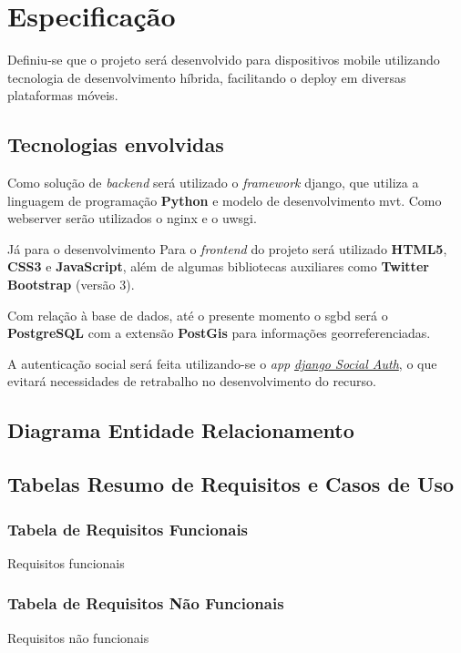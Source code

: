 \chapter{Especificação}\label{chp: Especificação}
Definiu-se que o projeto será desenvolvido para dispositivos mobile utilizando tecnologia de desenvolvimento híbrida, facilitando o deploy em diversas plataformas móveis.

\section{Tecnologias envolvidas}\label{sec: TecEnvolv}
Como solução de \textit{backend} será utilizado o \textit{framework} \gls{django}, que utiliza a linguagem de programação \textbf{Python} e modelo de desenvolvimento \gls{mvt}. Como webserver serão utilizados o \gls{nginx} e o \gls{uwsgi}.

Já para o desenvolvimento Para o \textit{frontend} do projeto será utilizado \textbf{HTML5}, \textbf{CSS3} e \textbf{JavaScript}, além de algumas bibliotecas auxiliares como \textbf{Twitter Bootstrap} (versão 3).

Com relação à base de dados, até o presente momento o \gls{sgbd} será o \textbf{PostgreSQL} com a extensão \textbf{PostGis} para informações georreferenciadas.

A autenticação social será feita utilizando-se o \textit{app} \textit{\href{https://django-social-auth.readthedocs.org/en/latest/}{django Social Auth}}, o que evitará necessidades de retrabalho no desenvolvimento do recurso.

\section{Diagrama Entidade Relacionamento}





\section{Tabelas Resumo de Requisitos e Casos de Uso}
\subsection{Tabela de Requisitos Funcionais}\label{subsec:tabResReqF}
   \begin{table}[H]
        \centering
        \caption{Requisitos funcionais}
        \label{tab:reqFunc}
        \PrintRequisitosFunc
    \end{table}
    

\subsection{Tabela de Requisitos Não Funcionais}\label{subsec:tabResReqNF}
   \begin{table}[H]
        \centering
        \caption{Requisitos não funcionais}
        \label{tab:reqNFunc}
        \PrintRequisitosNFunc
    \end{table}


